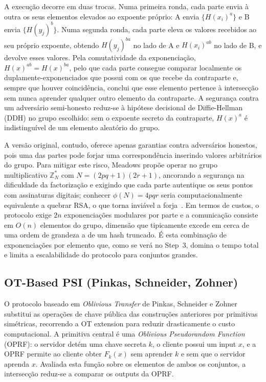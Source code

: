 A execução decorre em duas trocas. Numa primeira ronda, cada parte envia à outra os seus elementos elevados ao expoente próprio: A envia $\{H(x_i)^{a}\}$ e B envia $\{H(y_j)^{b}\}$. Numa segunda ronda, cada parte eleva os valores recebidos ao seu próprio expoente, obtendo $H(y_j)^{ba}$ no lado de A e $H(x_i)^{ab}$ no lado de B, e devolve esses valores. Pela comutatividade da exponenciação, $H(x)^{ab} = H(x)^{ba}$, pelo que cada parte consegue comparar localmente os duplamente-exponenciados que possui com os que recebe da contraparte e, sempre que houver coincidência, conclui que esse elemento pertence à intersecção sem nunca aprender qualquer outro elemento da contraparte. A segurança contra um adversário semi-honesto reduz-se à hipótese decisional de Diffie-Hellman (DDH) no grupo escolhido: sem o expoente secreto da contraparte, $H(x)^{a}$ é indistinguível de um elemento aleatório do grupo.

A versão original, contudo, oferece apenas garantias contra adversários honestos, pois uma das partes pode forjar uma correspondência inserindo valores arbitrários do grupo. Para mitigar este risco, Meadows propõe operar no grupo multiplicativo $\mathbb{Z}_N^*$ com $N=(2pq+1)(2r+1)$, ancorando a segurança na dificuldade da factorização e exigindo que cada parte autentique os seus pontos com assinaturas digitais; conhecer $\phi(N)=4pqr$ seria computacionalmente equivalente a quebrar RSA, o que torna inviável a forja~\cite{meadows1986matchmaking}. Em termos de custos, o protocolo exige $2n$ exponenciações modulares por parte e a comunicação consiste em $O(n)$ elementos do grupo, dimensão que tipicamente excede em cerca de uma ordem de grandeza a de um hash truncado. É esta combinação de exponenciações por elemento que, como se verá no Step~3, domina o tempo total e limita a escalabilidade do protocolo para conjuntos grandes.

\subsection{OT-Based PSI (Pinkas, Schneider, Zohner)}
\label{sec:ot}

O protocolo baseado em \emph{Oblivious Transfer} de Pinkas, Schneider e Zohner~\cite{pinkas2014faster, pinkas2016scalable} substitui as operações de chave pública das construções anteriores por primitivas simétricas, recorrendo a OT extension para reduzir drasticamente o custo computacional. A primitiva central é uma \emph{Oblivious Pseudorandom Function} (OPRF): o servidor detém uma chave secreta $k$, o cliente possui um input $x$, e a OPRF permite ao cliente obter $F_k(x)$ sem aprender $k$ e sem que o servidor aprenda $x$. Avaliada esta função sobre os elementos de ambos os conjuntos, a intersecção reduz-se a comparar os outputs da OPRF.

